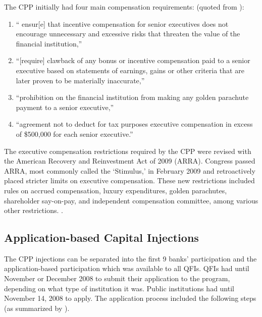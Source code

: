 \documentclass[12pt]{article}
\begin{document}
The CPP initially had four main compensation requirements: (quoted from \citet{CPPAnnouncement}):
\begin{enumerate}
\item `` ensur[e] that incentive compensation for senior executives does not encourage unnecessary and excessive risks that threaten the value of the financial institution,''
\item ``[require] clawback of any bonus or incentive compensation paid to a senior executive based on statements of earnings, gains or other criteria that are later proven to be materially inaccurate,''
\item ``prohibition on the financial institution from making any golden parachute payment to a senior executive,''
\item ``agreement not to deduct for tax purposes executive compensation in excess of \$500,000 for each senior executive.''
\end{enumerate}

The executive compensation restrictions required by the CPP were revised with the American Recovery and Reinvestment Act of 2009 (ARRA). Congress passed ARRA, most commonly called the `Stimulus,' in February 2009 and retroactively placed stricter limits on executive compensation. These new restrictions included rules on accrued compensation, luxury expenditures, golden parachutes, shareholder say-on-pay, and independent compensation committee, among various other restrictions. \citep{mofoComp}.

\subsection*{Application-based Capital Injections}

The CPP injections can be separated into the first 9 banks' participation and the application-based participation which was available to all QFIs. QFIs had until November or December 2008 to submit their application to the program, depending on what type of institution it was. Public institutions had until November 14, 2008 to apply. The application process included the following steps (as summarized by \citet{mofo}).
\end{document}
